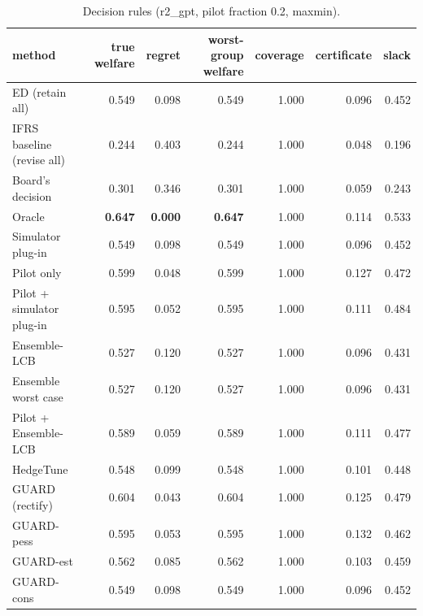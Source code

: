 \begin{table}[t]
\centering
\small
\begin{tabular}{lrrrrrr}
\toprule
method & true welfare & regret & worst-group welfare & coverage & certificate & slack \\
\midrule
ED (retain all) & 0.549 & 0.098 & 0.549 & 1.000 & 0.096 & 0.452 \\
IFRS baseline (revise all) & 0.244 & 0.403 & 0.244 & 1.000 & 0.048 & 0.196 \\
Board's decision & 0.301 & 0.346 & 0.301 & 1.000 & 0.059 & 0.243 \\
Oracle & \textbf{0.647} & \textbf{0.000} & \textbf{0.647} & 1.000 & 0.114 & 0.533 \\
Simulator plug-in & 0.549 & 0.098 & 0.549 & 1.000 & 0.096 & 0.452 \\
Pilot only & 0.599 & 0.048 & 0.599 & 1.000 & 0.127 & 0.472 \\
Pilot + simulator plug-in & 0.595 & 0.052 & 0.595 & 1.000 & 0.111 & 0.484 \\
Ensemble-LCB & 0.527 & 0.120 & 0.527 & 1.000 & 0.096 & 0.431 \\
Ensemble worst case & 0.527 & 0.120 & 0.527 & 1.000 & 0.096 & 0.431 \\
Pilot + Ensemble-LCB & 0.589 & 0.059 & 0.589 & 1.000 & 0.111 & 0.477 \\
HedgeTune & 0.548 & 0.099 & 0.548 & 1.000 & 0.101 & 0.448 \\
GUARD (rectify) & 0.604 & 0.043 & 0.604 & 1.000 & 0.125 & 0.479 \\
GUARD-pess & 0.595 & 0.053 & 0.595 & 1.000 & 0.132 & 0.462 \\
GUARD-est & 0.562 & 0.085 & 0.562 & 1.000 & 0.103 & 0.459 \\
GUARD-cons & 0.549 & 0.098 & 0.549 & 1.000 & 0.096 & 0.452 \\
\bottomrule
\end{tabular}
\caption{Decision rules (r2\_gpt, pilot fraction 0.2, maxmin).}
\label{tab:methods-maxmin}
\end{table}
